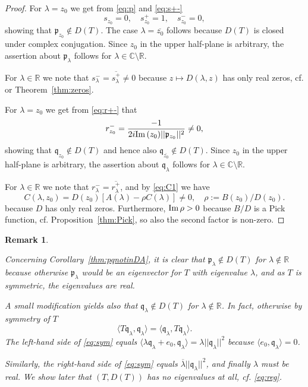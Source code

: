 \documentclass [12pt]{article}
\def\Im{{\rm Im}\,}
\newtheorem{rem}[thm]{Remark}
\newcommand{\C}{\mathbb{C}}
\newcommand{\R}{\mathbb{R}}
\newcommand{\la}{\lambda}
\begin{document}
\begin{proof} For $\la =z_0$ we get from \eqref{eq:p} and \eqref{eq:s+-}
$$
s_{z_0}=0,\quad s_{z_0}^+=1,\quad s_{z_0}^-=0,
$$
showing that $\mathfrak{p}_{z_0}\notin D(T)$. The case $\la=\overline{z_0}$ follows because $D(T)$ is closed under complex conjugation. Since $z_0$ in the upper half-plane is arbitrary, the  assertion about $\mathfrak{p}_{\la}$ follows for $\la\in\C\setminus\R$. 

For $\la\in\R$ we note that $s_\la^-=\overline{s_\la^+}\neq 0$ because $z\mapsto D(\la,z)$ has only real zeros, cf. \cite[Theorem 3]{B:C}
or Theorem~\ref{thm:zeros}.

For $\la =z_0$ we get from \eqref{eq:r+-} that
$$
 r_{z_0}^-=\frac{-1}{2i\Im(z_0)||\mathfrak{p}_{z_0}||^2}\neq 0,
$$
showing that $\mathfrak{q}_{z_0}\notin D(T)$ and hence also $\mathfrak{q}_{\overline{z_0}}\notin D(T)$. Since $z_0$ in the upper half-plane is arbitrary, the assertion about $\mathfrak{q}_{\la}$ follows for $\la\in\C\setminus\R$. 

For $\la\in\R$ we note that $r_\la^{-}=\overline{r_\la^+}$, and by \eqref{eq:C1} we have
$$
C(\la,z_0)=D(z_0)[A(\la)-\rho C(\la)]\neq 0,\quad \rho:=B(z_0)/D(z_0).
$$
because $D$ has only real zeros. Furthermore, $\Im\rho>0$ because $B/D$ is a Pick function, cf. Proposition~\ref{thm:Pick}, so also the second factor is non-zero.
\end{proof}

\begin{rem}\label{thm:simple}{\rm Concerning Corollary~\ref{thm:pqnotinDA}, it is clear that $\mathfrak{p}_\la\notin D(T)$ for $\la\notin\R$ because otherwise  $\mathfrak{p}_\la$ would be an eigenvector for $T$ with eigenvalue $\la$, and as $T$ is symmetric, the eigenvalues are real. 

A small modification yields also that $\mathfrak{q}_\la\notin D(T)$ for $\la\notin\R$. 
In fact, otherwise by symmetry of $T$
\begin{equation}\label{eq:sym}
\langle T\mathfrak{q}_\la, \mathfrak{q}_\la\rangle=\langle \mathfrak{q}_\la,T \mathfrak{q}_\la\rangle.
\end{equation}
The left-hand side of \eqref{eq:sym} equals $\langle \la\mathfrak{q}_\la+e_0, \mathfrak{q}_\la\rangle=
\la||\mathfrak{q}_\la||^2$
because $\langle e_0,\mathfrak{q}_\la\rangle=0$.

Similarly, the right-hand side of \eqref{eq:sym} equals $\overline{\la}||\mathfrak{q}_\la||^2$,
and finally $\la$ must be real. We show later that $(T, D(T))$ has no eigenvalues at all, cf. \eqref{eq:reg}.
}
\end{rem}
\end{document}

